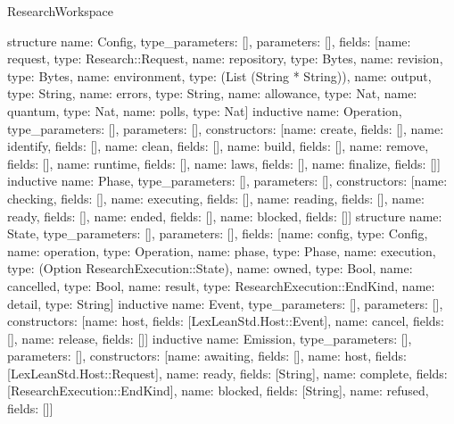\begin{lexlean}{ResearchWorkspace}
\begin{semanticmodule}
structure{
 name: Config,
 type_parameters: [],
 parameters: [],
 fields: [{name: request, type: Research::Request}, {name: repository, type: Bytes}, {name: revision, type: Bytes}, {name: environment, type: (List (String * String))}, {name: output, type: String}, {name: errors, type: String}, {name: allowance, type: Nat}, {name: quantum, type: Nat}, {name: polls, type: Nat}]
}
inductive{
 name: Operation,
 type_parameters: [],
 parameters: [],
 constructors: [{name: create, fields: []}, {name: identify, fields: []}, {name: clean, fields: []}, {name: build, fields: []}, {name: remove, fields: []}, {name: runtime, fields: []}, {name: laws, fields: []}, {name: finalize, fields: []}]
}
inductive{
 name: Phase,
 type_parameters: [],
 parameters: [],
 constructors: [{name: checking, fields: []}, {name: executing, fields: []}, {name: reading, fields: []}, {name: ready, fields: []}, {name: ended, fields: []}, {name: blocked, fields: []}]
}
structure{
 name: State,
 type_parameters: [],
 parameters: [],
 fields: [{name: config, type: Config}, {name: operation, type: Operation}, {name: phase, type: Phase}, {name: execution, type: (Option ResearchExecution::State)}, {name: owned, type: Bool}, {name: cancelled, type: Bool}, {name: result, type: ResearchExecution::EndKind}, {name: detail, type: String}]
}
inductive{
 name: Event,
 type_parameters: [],
 parameters: [],
 constructors: [{name: host, fields: [LexLeanStd.Host::Event]}, {name: cancel, fields: []}, {name: release, fields: []}]
}
inductive{
 name: Emission,
 type_parameters: [],
 parameters: [],
 constructors: [{name: awaiting, fields: []}, {name: host, fields: [LexLeanStd.Host::Request]}, {name: ready, fields: [String]}, {name: complete, fields: [ResearchExecution::EndKind]}, {name: blocked, fields: [String]}, {name: refused, fields: []}]
}


\end{semanticmodule}
\end{lexlean}
